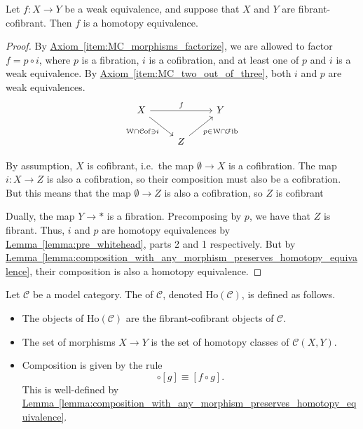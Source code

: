 \documentclass[main.tex]{subfiles}
\begin{document}
\begin{theorem}[Whitehead]
  \label{thm:whitehead}
  Let $f\colon X \to Y$ be a weak equivalence, and suppose that $X$ and $Y$ are fibrant-cofibrant. Then $f$ is a homotopy equivalence.
\end{theorem}
\begin{proof}
  By \hyperref[item:MC_morphisms_factorize]{Axiom~\ref*{item:MC_morphisms_factorize}}, we are allowed to factor $f = p \circ i$, where $p$ is a fibration, $i$ is a cofibration, and at least one of $p$ and $i$ is a weak equivalence. By \hyperref[item:MC_two_out_of_three]{Axiom~\ref*{item:MC_two_out_of_three}}, both $i$ and $p$ are weak equivalences.
  \begin{equation*}
    \begin{tikzcd}
      X
      \arrow[rr, "f"]
      \arrow[dr, swap, "\W \cap \cof \ni i"]
      && Y
      \\
      & Z
      \arrow[ur, swap, "p \in \W \cap \fib"]
    \end{tikzcd}
  \end{equation*}

  By assumption, $X$ is cofibrant, i.e.\ the map $\emptyset \to X$ is a cofibration. The map $i\colon X \to Z$ is also a cofibration, so their composition must also be a cofibration. But this means that the map $\emptyset \to Z$ is also a cofibration, so $Z$ is cofibrant

  Dually, the map $Y \to *$ is a fibration. Precomposing by $p$, we have that $Z$ is fibrant. Thus, $i$ and $p$ are homotopy equivalences by \hyperref[lemma:pre_whitehead]{Lemma~\ref*{lemma:pre_whitehead}}, parts 2 and 1 respectively. But by \hyperref[lemma:composition_with_any_morphism_preserves_homotopy_equivalence]{Lemma~\ref*{lemma:composition_with_any_morphism_preserves_homotopy_equivalence}}, their composition is also a homotopy equivalence.
\end{proof}

\begin{definition}
  \label{def:homopy_category}
  Let $\mathcal{C}$ be a model category. The  of $\mathcal{C}$, denoted $\mathrm{Ho}(\mathcal{C})$, is defined as follows.
  \begin{itemize}
    \item The objects of $\mathrm{Ho}(\mathcal{C})$ are the fibrant-cofibrant objects of $\mathcal{C}$.

    \item The set of morphisms $X \to Y$ is the set of homotopy classes of $\mathcal{C}(X, Y)$.

    \item Composition is given by the rule
      \begin{equation*}
        [f] \circ [g] \equiv [f \circ g].
      \end{equation*}
      This is well-defined by \hyperref[lemma:composition_with_any_morphism_preserves_homotopy_equivalence]{Lemma~\ref*{lemma:composition_with_any_morphism_preserves_homotopy_equivalence}}.
  \end{itemize}
\end{definition}
\end{document}
